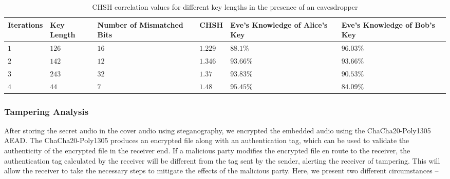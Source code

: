 \documentclass{article}
\begin{document}
\begin{table}[!h]
    \begin{center}
        \caption{CHSH correlation values for different key lengths in the presence of an eavesdropper}
        \begin{tabularx}{\textwidth}{>{\centering\arraybackslash}X>{\centering\arraybackslash}X>{\centering\arraybackslash}X>{\centering\arraybackslash}X>{\centering\arraybackslash}X>{\centering\arraybackslash}X}
            \hline
            Iterations & Key Length & Number of Mismatched Bits & CHSH    & Eve's Knowledge of Alice's Key & Eve's Knowledge of Bob's Key \\ \hline
            $1$        & $126$      & $16$                      & $1.229$ & $88.1\%$                       & $96.03\%$                    \\
            $2$        & $142$      & $12$                      & $1.346$ & $93.66\%$                      & $93.66\%$                    \\
            $3$        & $243$      & $32$                      & $1.37$  & $93.83\%$                      & $90.53\%$                    \\
            $4$        & $44$       & $7$                       & $1.48$  & $95.45\%$                      & $84.09\%$                    \\
            \hline
        \end{tabularx}
        \label{table:chshEveKnowledge}
    \end{center}
\end{table}
\subsubsection{Tampering Analysis}
After storing the secret audio in the cover audio using steganography, we encrypted the embedded audio using the ChaCha20-Poly1305 AEAD. The ChaCha20-Poly1305 produces an encrypted file along with an authentication tag, which can be used to validate the authenticity of the encrypted file in the receiver end. If a malicious party modifies the encrypted file en route to the receiver, the authentication tag calculated by the receiver will be different from the tag sent by the sender, alerting the receiver of tampering. This will allow the receiver to take the necessary steps to mitigate the effects of the malicious party. Here, we present two different circumstances --
\end{document}
